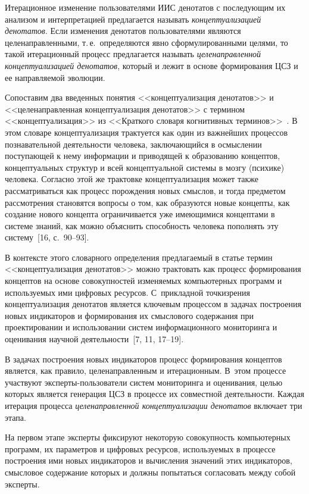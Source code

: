 \begin{multicols}{2}
   Итерационное изменение пользователями ИИС денотатов с последующим их анализом и 
интерпретацией предлагается называть \textit{концептуализацией денотатов}. Если 
изменения денотатов пользователями являются целенаправленными, т.\,е.\ определяются 
явно сформулированными целями, то такой итерационный процесс предлагается называть 
\textit{целенаправленной концептуализацией денотатов}, который и лежит в основе 
формирования ЦСЗ и ее направляемой эволюции.
   
   Сопоставим два введенных понятия <<кон\-цеп\-туализация денотатов>> и 
<<целенаправленная кон\-цептуализация денотатов>> с термином <<концептуализация>> из 
<<Краткого словаря когнитивных терминов>>~\cite{16zat}. В этом словаре 
концептуализация трактуется как один из важнейших процессов познавательной 
деятельности человека, за\-клю\-ча\-ющий\-ся в осмыслении поступающей к нему инфор\-мации и 
приводящей к образованию концептов, концептуальных структур и всей концептуальной 
системы в мозгу (психике) человека. Согласно этой же трактовке концептуализация может 
также рассматриваться как процесс порождения новых смыс\-лов, и тогда предметом 
рассмотрения становятся вопросы о том, как образуются новые концепты, как создание 
нового концепта ограничивается уже име\-ющи\-ми\-ся концептами в системе знаний, как можно 
объяснить способность человека пополнять эту сис\-те\-му~[16, с.~90--93].
   
   В контексте этого словарного определения предлагаемый в статье термин 
<<концептуализация денотатов>> можно трактовать как процесс формирования концептов 
на основе совокупностей изменяемых компьютерных программ и ис\-поль\-зу\-емых ими 
цифровых ресурсов. С~прикладной точки\linebreak зрения концептуализация денотатов является 
ключевым процессом в задачах построения новых индикаторов и формирования их 
смыслового содержания при проектировании и использовании систем информационного 
мониторинга и оценивания научной деятельности~[7, 11, 17--19]. 

   
  В задачах построения новых индикаторов процесс формирования концептов является, как 
правило, целенаправленным и итерационным. В~этом процессе участвуют 
   эксперты-пользователи систем мониторинга и оценивания, целью которых является 
генерация ЦСЗ в процессе их совместной деятельности. Каждая итерация процесса 
\textit{це\-ле\-на\-прав\-лен\-ной концептуализации денотатов} включает три этапа.
   
   На первом этапе эксперты фиксируют некоторую совокупность компьютерных программ, 
их параметров и цифровых ресурсов, используемых в процессе построения ими новых 
индикаторов и вычисления значений этих индикаторов, смысловое содержание которых и 
должны попытаться согласовать между собой эксперты.
   

\end{multicols}
